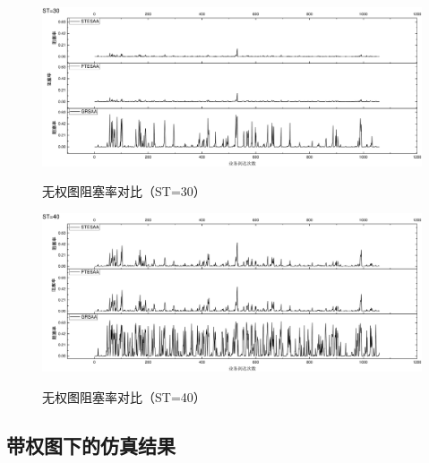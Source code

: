 \begin{figure}
\setlength{\abovecaptionskip}{-0.5cm}
\begin{center}
{\includegraphics[width=1 \textwidth]{figures/B30Z.pdf}}
\end{center}
\caption{{\footnotesize{无权图阻塞率对比（ST=30）}}}
\label{B40Z}
\end{figure}
\begin{figure}
\setlength{\abovecaptionskip}{-0.5cm}
\begin{center}
{\includegraphics[width=1 \textwidth]{figures/B40Z.pdf}}
\end{center}
\caption{{\footnotesize{无权图阻塞率对比（ST=40）}}}
\label{B40Z}
\end{figure}
\subsection{带权图下的仿真结果}
